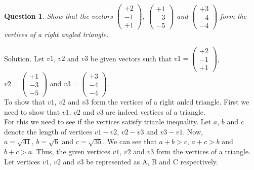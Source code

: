 \documentclass{article}
\newtheorem{question}[theorem]{Question}
\begin{document}
\begin{question}
	Show that the vectors $\begin{pmatrix} 
		 +2\\-1\\+1 
	\end{pmatrix}$, $\begin{pmatrix} 
	 +1\\-3\\-5 
\end{pmatrix}$ and $\begin{pmatrix} 
+3\\-4\\-4 
\end{pmatrix}$ form the vertices of a right angled triangle.
\end{question}
Solution. Let $v1$, $v2$ and $v3$ be given vectors such that $v1 =\begin{pmatrix} 
	+2\\-1\\+1 
\end{pmatrix}$,\\     
$v2= \begin{pmatrix} 
+1\\-3\\-5 
\end{pmatrix}$ and $v3= \begin{pmatrix} 
+3\\-4\\-4 
\end{pmatrix}$.\\
To show that $v1$, $v2$ and $v3$ form the vertices of a right anled triangle. First we need to show that $v1$, $v2$ and $v3$ are indeed vertices of a triangle.\\
For this we need to see if the vertices satisfy trianle inequality. Let $a$, $b$ and $c$ denote the length of vertices $v1-v2$, $v2-v3$ and $v3-v1$. Now,\\
$a=\sqrt{41}$, $b=\sqrt{6}$ and $c=\sqrt{35}$. We can see that  $a+b>c$, 
$a+c>b$ and $b+c >a$. Thus, the given vertices $v1$, $v2$ and $v3$ form the vertices of a triangle. Let vertices $v1$, $v2$ and $v3$ be represented as A, B and C respectively.\\
\end{document}
